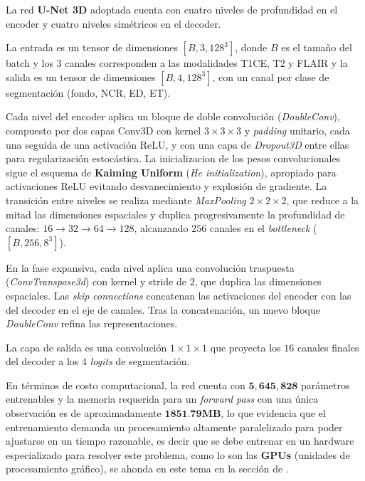 La red \textbf{U-Net 3D} adoptada cuenta con cuatro niveles de profundidad en el encoder y cuatro niveles simétricos en el decoder. 

La entrada es un tensor de dimensiones $[B, 3, 128^3]$, donde $B$ es el tamaño del batch y los 3 canales corresponden a las modalidades T1CE, T2 y FLAIR y la salida es un tensor de dimensiones $[B, 4, 128^3]$, con un canal por clase de segmentación (fondo, NCR, ED, ET).

Cada nivel del encoder aplica un bloque de doble convolución (\textit{DoubleConv}), compuesto por dos capas Conv3D con kernel $3\times3\times3$ y \textit{padding} 
unitario, cada una seguida de una activación ReLU, y con una capa de 
\textit{Dropout3D} entre ellas para regularización estocástica. La inicializacion de los pesos convolucionales sigue el esquema de \textbf{Kaiming Uniform} (\textit{He initialization}), apropiado para activaciones ReLU evitando desvanecimiento y explosión de gradiente. La transición entre niveles se realiza mediante \textit{MaxPooling} $2\times2\times2$, que reduce a la mitad las dimensiones espaciales y duplica progresivamente la profundidad de canales: $16 \to 32 \to 64 \to 128$, alcanzando $256$ canales en el \textit{bottleneck} ($[B, 256, 8^3]$).

\vspace{0.25cm}

En la fase expansiva, cada nivel aplica una convolución traspuesta (\textit{ConvTranspose3d}) con kernel y stride de $2$, que duplica las dimensiones espaciales. Las \textit{skip connections} concatenan las activaciones del encoder con las del decoder en el eje de canales. Tras la concatenación, un nuevo bloque \textit{DoubleConv} refina las representaciones.

La capa de salida es una convolución $1\times1\times1$ que proyecta los $16$ canales finales del decoder a los $4$ \textit{logits} de segmentación.

\vspace{0.25cm}

En términos de costo computacional, la red cuenta con $\mathbf{5{,}645{,}828}$ parámetros entrenables y la memoria requerida para un \textit{forward pass} con una única observación es de aproximadamente $\mathbf{1851{.}79MB}$, lo que evidencia que el entrenamiento demanda un procesamiento altamente paralelizado para poder ajustarse en un tiempo razonable, es decir que se debe entrenar en un hardware especializado para resolver este problema, como lo son las \textbf{GPUs} (unidades de procesamiento gráfico), se ahonda en este tema en la sección de .

